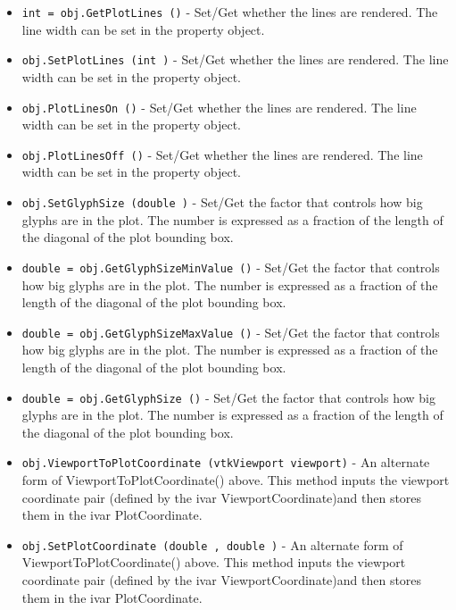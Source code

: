 \begin{itemize}
\item  \verb|int = obj.GetPlotLines ()| -  Set/Get whether the lines are rendered.  The line width can be set in
 the property object. 

\item  \verb|obj.SetPlotLines (int )| -  Set/Get whether the lines are rendered.  The line width can be set in
 the property object. 

\item  \verb|obj.PlotLinesOn ()| -  Set/Get whether the lines are rendered.  The line width can be set in
 the property object. 

\item  \verb|obj.PlotLinesOff ()| -  Set/Get whether the lines are rendered.  The line width can be set in
 the property object. 

\item  \verb|obj.SetGlyphSize (double )| -  Set/Get the factor that controls how big glyphs are in the plot.
 The number is expressed as a fraction of the length of the diagonal
 of the plot bounding box.

\item  \verb|double = obj.GetGlyphSizeMinValue ()| -  Set/Get the factor that controls how big glyphs are in the plot.
 The number is expressed as a fraction of the length of the diagonal
 of the plot bounding box.

\item  \verb|double = obj.GetGlyphSizeMaxValue ()| -  Set/Get the factor that controls how big glyphs are in the plot.
 The number is expressed as a fraction of the length of the diagonal
 of the plot bounding box.

\item  \verb|double = obj.GetGlyphSize ()| -  Set/Get the factor that controls how big glyphs are in the plot.
 The number is expressed as a fraction of the length of the diagonal
 of the plot bounding box.

\item  \verb|obj.ViewportToPlotCoordinate (vtkViewport viewport)| -  An alternate form of ViewportToPlotCoordinate() above. This method
 inputs the viewport coordinate pair (defined by the ivar 
 ViewportCoordinate)and then stores them in the ivar PlotCoordinate. 

\item  \verb|obj.SetPlotCoordinate (double , double )| -  An alternate form of ViewportToPlotCoordinate() above. This method
 inputs the viewport coordinate pair (defined by the ivar 
 ViewportCoordinate)and then stores them in the ivar PlotCoordinate. 


\end{itemize}
